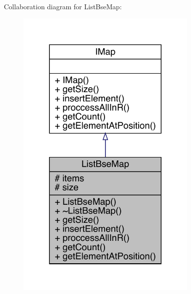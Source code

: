 Collaboration diagram for List\+Bse\+Map\+:
\nopagebreak
\begin{figure}[H]
\begin{center}
\leavevmode
\includegraphics[width=251pt]{dc/de6/a00167}
\end{center}
\end{figure}
